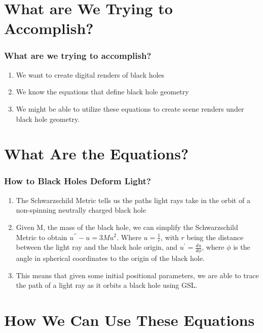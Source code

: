 \documentclass[dvipsnames,aspectratio=169]{beamer}
\begin{document}



\section{What are We Trying to Accomplish?}

\begin{frame}
\frametitle{What are we trying to accomplish?}
\begin{enumerate}
    \item{
            We want to create digital renders of black holes
    }
    \item{
            We know the equations that define black hole geometry
    }
    \item{
            We might be able to utilize these equations to create scene renders under black hole geometry.
    }
\end{enumerate}
\end{frame}

\section{What Are the Equations?}

\begin{frame}
\frametitle{How to Black Holes Deform Light?}
\begin{enumerate}
    \item{
            The Schwarzschild Metric tells us the paths light rays take in the orbit of a non-spinning neutrally charged black hole
    }
    \item{
            Given M, the mass of the black hole,
            we can simplify the Schwarzschild Metric to obtain $u^{\prime\prime}-u=3Mu^{2}$\cite{gravitation-mtw}. Where $u=\frac1{r}$, 
             with $r$ being the distance between the light ray and the black hole origin,
             and $u^\prime=\frac{du}{d\phi}$, 
             where $\phi$ is the angle in spherical coordinates to the origin of the black hole.
    }
    \item{
            This means that given some initial positional parameters, we are able to trace the path of a light ray as it orbits a black hole using GSL.
    }
\end{enumerate}
\end{frame}

\section{How We Can Use These Equations}
\end{document}
